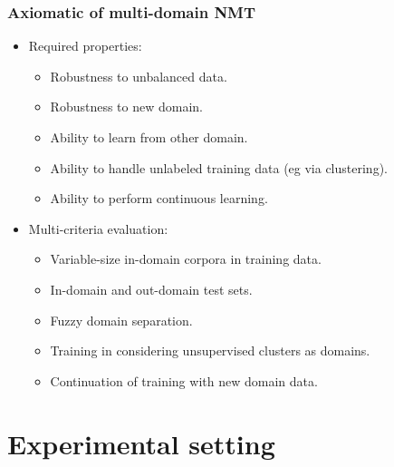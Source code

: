 \documentclass{beamer}
\begin{document}
\begin{frame}
\frametitle{Axiomatic of multi-domain NMT}

\begin{itemize}
\item<1-> Required properties:
	\begin{itemize}
		\item<2-> Robustness to unbalanced data.
		\item<3-> Robustness to new domain.
		\item<4-> Ability to learn from other domain.
		\item<5-> Ability to handle unlabeled training data (eg via clustering).
		\item<6-> Ability to perform continuous learning.
	\end{itemize}
\item<7-> Multi-criteria evaluation:
	\begin{itemize}
		\item<8-> Variable-size in-domain corpora in training data.
		\item<9-> In-domain and out-domain test sets. 
		\item<10-> Fuzzy domain separation.
		\item<11-> Training in considering unsupervised clusters as domains.
		\item<12-> Continuation of training with new domain data.
	\end{itemize}
\end{itemize}

\end{frame}


\section{Experimental setting} %
\end{document}
